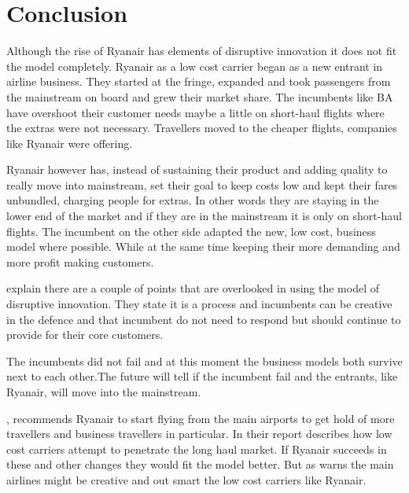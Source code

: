 \documentclass[a4paper, 11pt]{article}
\begin{document}
\section{Conclusion}

Although the rise of Ryanair has elements of disruptive innovation it does not fit the model completely. Ryanair as a low cost carrier began as a new entrant in airline business. They started at the fringe, expanded and took passengers from the mainstream on board and grew their market share. The incumbents like BA have overshoot their customer needs maybe a little on short-haul flights where the extras were not necessary. Travellers moved to the cheaper flights, companies like Ryanair were offering.

Ryanair however has, instead of sustaining their product and adding quality to really move into mainstream, set their goal to keep costs low and kept their fares unbundled, charging people for extras. In other words they are staying in the lower end of the market and if they are in the mainstream it is only on short-haul flights. The incumbent on the other side adapted the new, low cost, business model where possible. While at the same time keeping their more demanding and more profit making customers.

\cite{Christensen2015} explain there are a couple of points that are overlooked in using the model of disruptive innovation. They state it is a process and incumbents can be creative in the defence and that incumbent do not need to respond but should continue to provide for their core customers.

The incumbents did not fail and at this moment the business models both survive next to each other.The future will tell if the incumbent fail and the entrants, like Ryanair, will move into the mainstream.

\cite{Diaconu}, recommends Ryanair to start flying from the main airports to get hold of more travellers and business travellers in particular. In their report \cite{Eurocontrol2018} describes how low cost carriers attempt to penetrate the long haul market. If Ryanair succeeds in these and other changes they would fit the model better. But as \cite{Christensen2015} warns the main airlines might be creative and out smart the low cost carriers like Ryanair.




\renewcommand{\textbf}{}
\renewcommand{\bf}{}
{}
\end{document}
